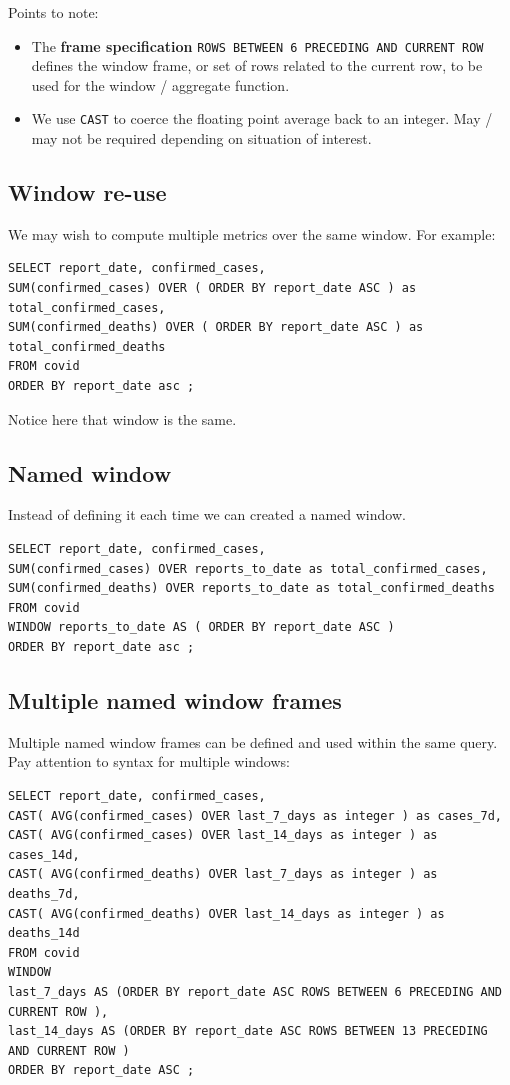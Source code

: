 \documentclass[slides]{pgnotes}
\begin{document}
\newpage
Points to note: 
\begin{itemize}
\item The \textbf{frame specification} \texttt{ROWS BETWEEN 6 PRECEDING AND CURRENT ROW}  defines the window frame, or set of rows related to the current row, to be used for the window / aggregate function. 
\item We use \texttt{CAST} to coerce the floating point average back to an integer. May / may not be required depending on situation of interest.
\end{itemize}

\subsection{Window re-use}

We may wish to compute multiple metrics over the same window.
For example: 
\begin{verbatim}
SELECT report_date, confirmed_cases,
SUM(confirmed_cases) OVER ( ORDER BY report_date ASC ) as total_confirmed_cases,
SUM(confirmed_deaths) OVER ( ORDER BY report_date ASC ) as total_confirmed_deaths 
FROM covid 
ORDER BY report_date asc ;
\end{verbatim}
Notice here that window is the same.

\subsection{Named window}

Instead of defining it each time we can created a named window. 
\begin{verbatim}
SELECT report_date, confirmed_cases,
SUM(confirmed_cases) OVER reports_to_date as total_confirmed_cases,
SUM(confirmed_deaths) OVER reports_to_date as total_confirmed_deaths 
FROM covid 
WINDOW reports_to_date AS ( ORDER BY report_date ASC ) 
ORDER BY report_date asc ;
\end{verbatim}

\subsection{Multiple named window frames}

Multiple named window frames can be defined and used within the same query.
Pay attention to syntax for multiple windows: 
\begin{verbatim}
SELECT report_date, confirmed_cases,
CAST( AVG(confirmed_cases) OVER last_7_days as integer ) as cases_7d,
CAST( AVG(confirmed_cases) OVER last_14_days as integer ) as cases_14d,
CAST( AVG(confirmed_deaths) OVER last_7_days as integer ) as deaths_7d,
CAST( AVG(confirmed_deaths) OVER last_14_days as integer ) as deaths_14d
FROM covid 
WINDOW
last_7_days AS (ORDER BY report_date ASC ROWS BETWEEN 6 PRECEDING AND CURRENT ROW ), 
last_14_days AS (ORDER BY report_date ASC ROWS BETWEEN 13 PRECEDING AND CURRENT ROW ) 
ORDER BY report_date ASC ;
\end{verbatim} 
\end{document}
